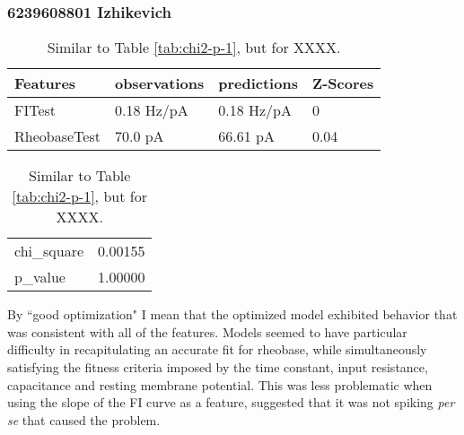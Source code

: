 
\subsubsection{6239608801 Izhikevich}




\begin{table}
\begin{center}
\begin{tabular}{|l|l|l|l|}
\toprule
Features & observations &   predictions & Z-Scores \\
\midrule
FITest       &   0.18 Hz/pA &  0.18 Hz/pA &        0 \\
RheobaseTest &      70.0 pA &      66.61 pA &     0.04 \\
\bottomrule
\end{tabular}
\end{center}
\begin{center}
\begin{tabular}{|l|r|}
\toprule
chi\_square &  0.00155 \\
p\_value    &  1.00000 \\
\bottomrule
\end{tabular}
\caption[Quality of Fit to Experimental Data]{Similar to Table \ref{tab:chi2-p-1}, but for XXXX.}
\end{center}
\end{table}


By ``good optimization" I mean that the optimized model exhibited behavior that was consistent with all of the features.
Models seemed to have particular difficulty in recapitulating an accurate fit for rheobase, while simultaneously satisfying the fitness criteria imposed by the time constant, input resistance, capacitance and resting membrane potential.
This was less problematic when using the slope of the FI curve as a feature, suggested that it was not spiking \emph{per se} that caused the problem.

